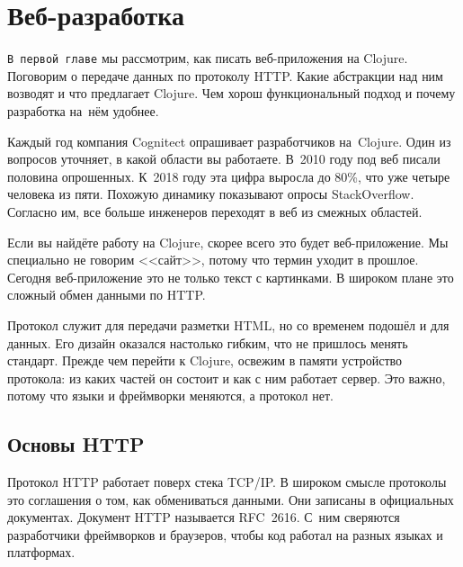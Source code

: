 \chapter{Веб-разработка}

\begin{teaser}
\verb|В первой главе| мы рассмотрим, как писать веб-приложения на
Clojure. Поговорим о передаче данных по протоколу HTTP. Какие абстракции над ним
возводят и что предлагает Clojure. Чем хорош функциональный подход и почему
разработка на~нём удобнее.
\end{teaser}


Каждый год компания Cognitect
опрашивает
разработчиков на~Clojure. Один из вопросов уточняет, в какой области вы
работаете. В~2010 году под веб писали половина опрошенных. К~2018 году эта цифра
выросла до 80\%, что уже четыре человека из пяти. Похожую динамику показывают
опросы StackOverflow.
Согласно им, все больше инженеров переходят в веб из смежных областей.

Если вы найдёте работу на Clojure, скорее всего это будет веб-приложение. Мы
специально не говорим <<сайт>>, потому что термин уходит в прошлое. Сегодня
веб-приложение это не только текст с картинками. В широком плане это сложный
обмен данными по HTTP.

Протокол служит для передачи разметки HTML, но со временем подошёл и для
данных. Его дизайн оказался настолько гибким, что не пришлось менять
стандарт. Прежде чем перейти к Clojure, освежим в памяти устройство протокола:
из каких частей он состоит и как с ним работает сервер. Это важно, потому что
языки и фреймворки меняются, а протокол нет.

\section{Основы HTTP}


Протокол HTTP работает поверх стека TCP/IP. В широком смысле протоколы это
соглашения о том, как обмениваться данными. Они записаны в официальных
документах. Документ HTTP называется RFC~2616.
С~ним сверяются разработчики фреймворков и браузеров, чтобы код работал
на разных языках и платформах.

